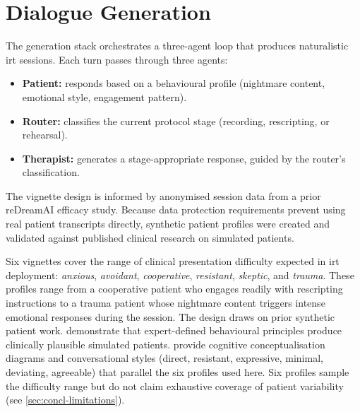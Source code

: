 \section{Dialogue Generation}
\label{sec:meth-dialogue}

The generation stack orchestrates a three-agent loop that produces
naturalistic \gls{irt} sessions. Each turn passes through three agents:

\begin{itemize}
  \item \textbf{Patient:} responds based on a behavioural profile
    (nightmare content, emotional style, engagement pattern).
  \item \textbf{Router:} classifies the current protocol stage
    (recording, rescripting, or rehearsal).
  \item \textbf{Therapist:} generates a stage-appropriate response,
    guided by the router's classification.
\end{itemize}

The vignette design is informed by anonymised session data from a prior
reDreamAI efficacy study. Because data protection requirements prevent
using real patient transcripts directly, synthetic patient profiles were
created and validated against published clinical research on simulated
patients.

Six vignettes cover the range of clinical presentation difficulty
expected in \gls{irt} deployment: \emph{anxious}, \emph{avoidant},
\emph{cooperative}, \emph{resistant}, \emph{skeptic}, and \emph{trauma}.
These profiles range from a cooperative patient who engages readily with
rescripting instructions to a trauma patient whose nightmare content
triggers intense emotional responses during the session. The design
draws on prior synthetic patient work. \textcite{Z22JYAMU} demonstrate that
expert-defined behavioural principles produce clinically plausible simulated
patients. \textcite{CQ94GEYA} provide cognitive conceptualisation diagrams
and conversational styles (direct, resistant, expressive, minimal, deviating,
agreeable) that parallel the six profiles used here. Six profiles sample
the difficulty range but do not claim exhaustive coverage of patient
variability (see \autoref{sec:concl-limitations}).

